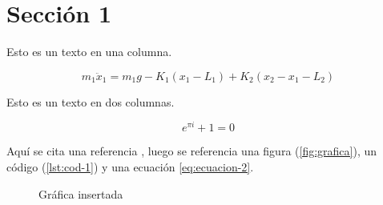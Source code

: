 \section{Sección 1}

Esto es un texto en una columna.

\lipsum[1]

\begin{equation}
  m_{1}\ddot x_{1} = m_{1}g - K_{1}\left(x_{1} - L_{1}\right) + K_{2}
                \left(x_{2} - x_{1} - L_{2}\right)
  \label{eq:ecuacion-1}
\end{equation}

\begin{multicols}{2}
  Esto es un texto en dos columnas.

  \lipsum[2][2-]
  \begin{equation}\label{eq:ecuacion-2}
    e^{\pi i} + 1 = 0
  \end{equation}

  \lipsum[3][5-]
\end{multicols}

Aquí se cita una referencia \cite{apunte-sld}, luego se referencia una figura
(\autoref{fig:grafica}), un código (\autoref{lst:cod-1}) y una ecuación \eqref{eq:ecuacion-2}.

\begin{figure}[ht!]
  \centering
  
  \caption{Gráfica insertada}
  \label{fig:grafica}
\end{figure}
